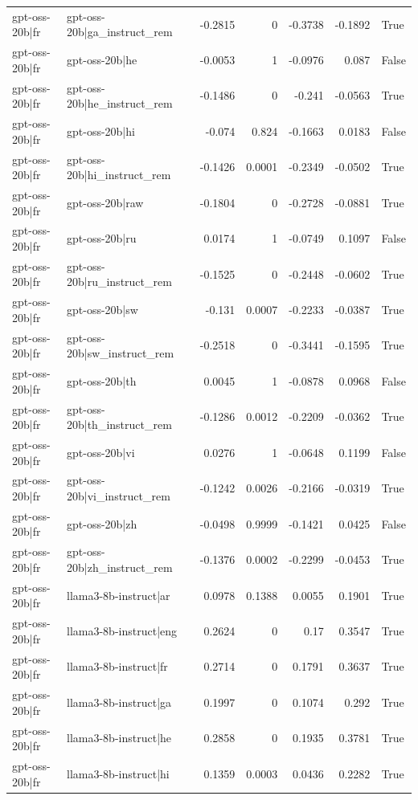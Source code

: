 \begin{table}
\begin{tabular}{l l r r r r l}
gpt-oss-20b|fr & gpt-oss-20b|ga_instruct_rem & -0.2815 & 0 & -0.3738 & -0.1892 & True \\
gpt-oss-20b|fr & gpt-oss-20b|he & -0.0053 & 1 & -0.0976 & 0.087 & False \\
gpt-oss-20b|fr & gpt-oss-20b|he_instruct_rem & -0.1486 & 0 & -0.241 & -0.0563 & True \\
gpt-oss-20b|fr & gpt-oss-20b|hi & -0.074 & 0.824 & -0.1663 & 0.0183 & False \\
gpt-oss-20b|fr & gpt-oss-20b|hi_instruct_rem & -0.1426 & 0.0001 & -0.2349 & -0.0502 & True \\
gpt-oss-20b|fr & gpt-oss-20b|raw & -0.1804 & 0 & -0.2728 & -0.0881 & True \\
gpt-oss-20b|fr & gpt-oss-20b|ru & 0.0174 & 1 & -0.0749 & 0.1097 & False \\
gpt-oss-20b|fr & gpt-oss-20b|ru_instruct_rem & -0.1525 & 0 & -0.2448 & -0.0602 & True \\
gpt-oss-20b|fr & gpt-oss-20b|sw & -0.131 & 0.0007 & -0.2233 & -0.0387 & True \\
gpt-oss-20b|fr & gpt-oss-20b|sw_instruct_rem & -0.2518 & 0 & -0.3441 & -0.1595 & True \\
gpt-oss-20b|fr & gpt-oss-20b|th & 0.0045 & 1 & -0.0878 & 0.0968 & False \\
gpt-oss-20b|fr & gpt-oss-20b|th_instruct_rem & -0.1286 & 0.0012 & -0.2209 & -0.0362 & True \\
gpt-oss-20b|fr & gpt-oss-20b|vi & 0.0276 & 1 & -0.0648 & 0.1199 & False \\
gpt-oss-20b|fr & gpt-oss-20b|vi_instruct_rem & -0.1242 & 0.0026 & -0.2166 & -0.0319 & True \\
gpt-oss-20b|fr & gpt-oss-20b|zh & -0.0498 & 0.9999 & -0.1421 & 0.0425 & False \\
gpt-oss-20b|fr & gpt-oss-20b|zh_instruct_rem & -0.1376 & 0.0002 & -0.2299 & -0.0453 & True \\
gpt-oss-20b|fr & llama3-8b-instruct|ar & 0.0978 & 0.1388 & 0.0055 & 0.1901 & True \\
gpt-oss-20b|fr & llama3-8b-instruct|eng & 0.2624 & 0 & 0.17 & 0.3547 & True \\
gpt-oss-20b|fr & llama3-8b-instruct|fr & 0.2714 & 0 & 0.1791 & 0.3637 & True \\
gpt-oss-20b|fr & llama3-8b-instruct|ga & 0.1997 & 0 & 0.1074 & 0.292 & True \\
gpt-oss-20b|fr & llama3-8b-instruct|he & 0.2858 & 0 & 0.1935 & 0.3781 & True \\
gpt-oss-20b|fr & llama3-8b-instruct|hi & 0.1359 & 0.0003 & 0.0436 & 0.2282 & True \\

\end{tabular}
\end{table}

